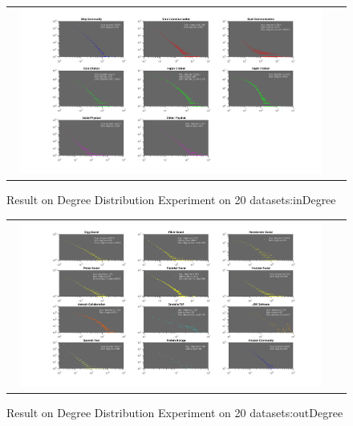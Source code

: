 \begin{figure}[H]
\begin{center}
\begin{tabular}{cc}
     \includegraphics[width=0.95\textwidth]{FIG/indegree2.png}
\end{tabular}
\caption{Result on Degree Distribution Experiment on 20 datasets:inDegree}
\end{center}
\end{figure}

\begin{figure}[H]
\begin{center}
\begin{tabular}{cc}
     \includegraphics[width=0.95\textwidth]{FIG/outdegree1.png}
\end{tabular}
\caption{Result on Degree Distribution Experiment on 20 datasets:outDegree}
\end{center}
\end{figure}

